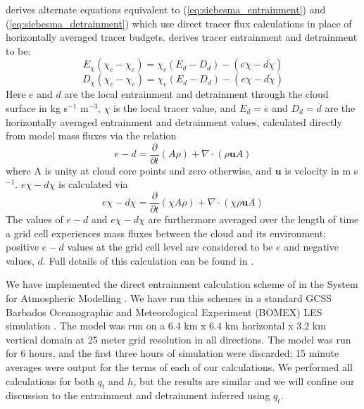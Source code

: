 \documentclass[draft,grl]{agutex}
\begin{document}
\begin{article}
\cite{Romps2010} derives alternate equations equivalent to 
(\ref{eq:siebesma_entrainment}) and (\ref{eq:siebesma_detrainment}) which use
direct tracer flux calculations in place of horizontally averaged tracer 
budgets.  \cite{Romps2010} derives tracer entrainment and detrainment to be:
\begin{equation}
  \label{eq:romps_entrainment}
  E_{\chi}(\chi_{c} - \chi_{e}) = \chi_{c}(E_d-D_d) 
                                - (\overline{e\chi} - \overline{d\chi})
\end{equation}
\begin{equation}
  \label{eq:romps_detrainment}
  D_{\chi}(\chi_{c} - \chi_{e}) = \chi_{e}(E_d-D_d) 
                                - (\overline{e\chi} - \overline{d\chi})
\end{equation}
Here $e$ and $d$ are the local entrainment and detrainment through the cloud 
surface in kg s$^{-1}$ m$^{-3}$, $\chi$ is the local tracer value, and
$E_d = \overline{e}$ and $D_d = \overline{d}$ are the horizontally averaged 
entrainment and detrainment values, calculated directly from model mass 
fluxes via the relation
\begin{equation}
  \label{eq:romps_e_minus_d}
  e - d = \frac{\partial}{\partial t}(A\rho) 
        + \nabla \cdot (\rho \mathbf{u} A) 
\end{equation}
where A is unity at cloud core points and zero otherwise, and $\mathbf{u}$ is 
velocity in m s$^{-1}$.  $e\chi - d\chi$ is calculated via 
\begin{equation}
  \label{eq:romps_echi_minus_dchi}
  e\chi - d\chi = \frac{\partial}{\partial t}(\chi A \rho) 
                + \nabla \cdot (\chi \rho \mathbf{u} A) 
\end{equation}
The values of $e - d$ and $e\chi - d\chi$ are furthermore averaged over the 
length of time a grid cell experiences mass fluxes between the cloud and its 
environment; positive $e-d$ values at the grid cell level are considered to 
be $e$ and negative values, $d$.  Full details of this calculation can be 
found in \cite{Romps2010}.

We have implemented the direct entrainment calculation scheme of 
\cite{Romps2010} in the System for Atmospheric Modelling 
\citep[SAM;][]{Khairoutdinov2003}.  We have run this schemes in a standard 
GCSS Barbados Oceanographic and Meteorological Experiment (BOMEX) LES 
simulation \citep{Holland1973, Siebesma2003}.  The model was run on a 6.4 km 
x 6.4 km horizontal x 3.2 km vertical domain at 25 meter grid resolution in 
all directions.  The model was run for 6 hours, and the first three hours 
of simulation were discarded; 15 minute averages were output for the terms 
of each of our calculations.  We performed all calculations for both $q_t$ 
and $h$, but the results are similar and we will confine our discussion to 
the entrainment and detrainment inferred using $q_t$.  


\end{article}
\end{document}
